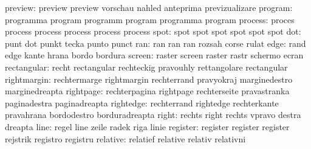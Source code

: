                   preview: preview                   preview
                           vorschau                  nahled
                           anteprima                 previzualizare
                  program: programma                 program
                           programm                  program
                           programma                 program
process: proces   process
         process  process
         process  process
   spot: spot spot
         spot spot
         spot spot
                      dot: punt                      dot
                           punkt                     tecka
                           punto                     punct
                      ran: ran                       ran
                           ran                       rozsah
                           corse                     rulat
                     edge: rand                      edge
                           kante                     hrana
                           bordo                     bordura
                   screen: raster                    screen
                           raster                    rastr
                           schermo                   ecran
              rectangular: recht                     rectangular
                           rechteckig                pravouhly
                           rettangolare              rectangular
              rightmargin: rechtermarge              rightmargin
                           rechterrand               pravyokraj
                           marginedestro             marginedreapta
                rightpage: rechterpagina             rightpage
                           rechterseite              pravastranka
                           paginadestra              paginadreapta
                rightedge: rechterrand               rightedge
                           rechterkante              pravahrana
                           bordodestro               borduradreapta
                    right: rechts                    right
                           rechts                    vpravo
                           destra                    dreapta
                     line: regel                     line
                           zeile                     radek
                           riga                      linie
                 register: register                  register
                           register                  rejstrik
                           registro                  registru
                 relative: relatief                  relative
                           relativ                   relativni
